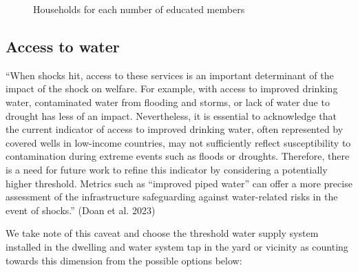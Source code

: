 \documentclass[
  letterpaper,
  DIV=11,
  numbers=noendperiod]{scrartcl}
\begin{document}
\begin{figure}[H]


\caption{\label{fig-hh-education}Households for each number of educated
members}

\end{figure}%

\subsection{Access to water}\label{access-to-water}

``When shocks hit, access to these services is an important determinant
of the impact of the shock on welfare. For example, with access to
improved drinking water, contaminated water from flooding and storms, or
lack of water due to drought has less of an impact. Nevertheless, it is
essential to acknowledge that the current indicator of access to
improved drinking water, often represented by covered wells in
low-income countries, may not sufficiently reflect susceptibility to
contamination during extreme events such as floods or droughts.
Therefore, there is a need for future work to refine this indicator by
considering a potentially higher threshold. Metrics such as ``improved
piped water'' can offer a more precise assessment of the infrastructure
safeguarding against water-related risks in the event of shocks.'' (Doan
et al. 2023)

We take note of this caveat and choose the threshold water supply system
installed in the dwelling and water system tap in the yard or vicinity
as counting towards this dimension from the possible options below:
\end{document}

